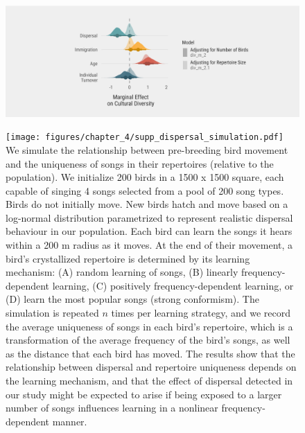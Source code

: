 \documentclass[9pt, onecolumn, twoside, lineno]{gsajnl}
\begin{document}
\begin{figure}[tbp]
    \centering
    \includegraphics[width=\linewidth]{figures/chapter_4/supp_absolute_cultural_diversity.pdf}
    \label{fig:supp_absolute_cultural_diversity}
\end{figure}

\begin{figure}[tbp]
    \centering
    \texttt{[image: figures/chapter\_4/supp\_dispersal\_simulation.pdf]}
    {
        We simulate the relationship between pre-breeding bird movement and the uniqueness of songs in their repertoires  (relative to the population). We initialize 200 birds in a 1500 x 1500 square, each capable of singing 4 songs selected from
        a pool of 200 song types. Birds do not initially move. New birds hatch and move based on a log-normal distribution parametrized to represent realistic dispersal behaviour in our population. Each bird can learn the songs it hears within a 200 m radius as it moves. At the end of their movement, a bird's crystallized repertoire is determined by its learning mechanism: (A) random learning of songs, (B) linearly frequency-dependent learning, (C) positively frequency-dependent learning, or (D) learn the most popular songs (strong conformism). The simulation is repeated $n$ times per learning strategy, and we record the average uniqueness of songs in each bird's repertoire, which is a transformation of the average frequency of the bird's songs, as well as the distance that each bird has moved. The results show that the relationship between dispersal and repertoire uniqueness depends on the learning mechanism, and that the effect of dispersal detected in our study might be expected to arise if being exposed to a larger number of songs influences learning in a nonlinear frequency-dependent manner.
    }
    \label{fig:supp_dispersal_simulation}
\end{figure}
\end{document}
